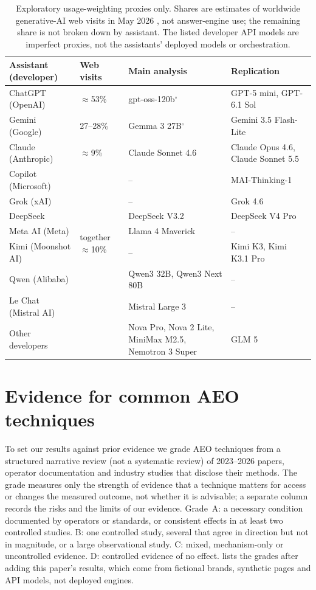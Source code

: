 \begin{table}[htbp]
\centering\small
\caption{Exploratory usage-weighting proxies only. Shares are estimates of worldwide generative-AI web visits in
May 2026 \citep{similarweb2026genai}, not answer-engine use; the remaining share is not broken down by assistant.
The listed developer API models are imperfect proxies, not the assistants' deployed models or orchestration.}
\label{tab:assistants}
\begin{tabularx}{\linewidth}{@{}ll>{\raggedright\arraybackslash}X>{\raggedright\arraybackslash}X@{}}
\toprule
Assistant (developer) & Web visits & Main analysis & Replication \\
\midrule
ChatGPT (OpenAI) & $\approx$53\% & gpt-oss-120b${}^{\circ}$ & GPT-5 mini, GPT-6.1 Sol \\
Gemini (Google) & 27--28\% & Gemma 3 27B${}^{\circ}$ & Gemini 3.5 Flash-Lite \\
Claude (Anthropic) & $\approx$9\% & Claude Sonnet 4.6 & Claude Opus 4.6, Claude Sonnet 5.5 \\
Copilot (Microsoft) & \multirow{7}{*}{\parbox{1.4cm}{together $\approx$10\%}} & -- & MAI-Thinking-1 \\
Grok (xAI) & & -- & Grok 4.6 \\
DeepSeek & & DeepSeek V3.2 & DeepSeek V4 Pro \\
Meta AI (Meta) & & Llama 4 Maverick & -- \\
Kimi (Moonshot AI) & & -- & Kimi K3, Kimi K3.1 Pro \\
Qwen (Alibaba) & & Qwen3 32B, Qwen3 Next 80B & -- \\
Le Chat (Mistral AI) & & Mistral Large 3 & -- \\
Other developers & & Nova Pro, Nova 2 Lite, MiniMax M2.5, Nemotron 3 Super & GLM 5 \\
\bottomrule
\end{tabularx}
\end{table}
\section{Evidence for common AEO techniques}
\label{app:evidence}

To set our results against prior evidence we grade AEO techniques from a structured narrative review (not a
systematic review) of 2023--2026 papers, operator documentation and industry studies that disclose their methods. The
grade measures only the strength of evidence that a technique matters for access or changes the measured outcome, not
whether it is advisable; a separate column records the risks and the limits of our evidence. Grade~A: a necessary
condition documented by operators or standards, or consistent effects in at least two controlled studies. B: one
controlled study, several that agree in direction but not in magnitude, or a large observational study. C: mixed,
mechanism-only or uncontrolled evidence. D: controlled evidence of no effect.  lists the grades
after adding this paper's results, which come from fictional brands, synthetic pages and API models, not deployed
engines.

